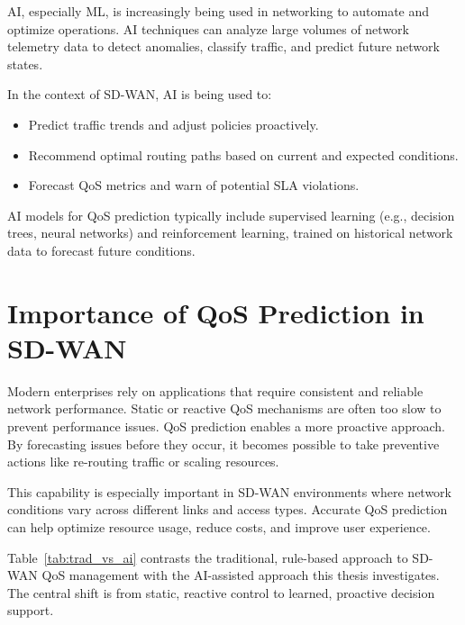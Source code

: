 \documentclass[a4paper,12pt]{Classes/RoboticsLaTeX}
\begin{document}
    AI, especially ML, is increasingly being used in networking to automate and optimize operations. AI techniques can analyze large volumes of network telemetry data to detect anomalies, classify traffic, and predict future network states.
    
    In the context of SD-WAN, AI is being used to:
    \begin{itemize}
        \item Predict traffic trends and adjust policies proactively.
        \item Recommend optimal routing paths based on current and expected conditions.
        \item Forecast QoS metrics and warn of potential SLA violations.
    \end{itemize}
    
    AI models for QoS prediction typically include supervised learning (e.g., decision trees, neural networks) and reinforcement learning, trained on historical network data to forecast future conditions.
    
    \section{Importance of QoS Prediction in SD-WAN}
    
    Modern enterprises rely on applications that require consistent and reliable network performance. Static or reactive QoS mechanisms are often too slow to prevent performance issues. QoS prediction enables a more proactive approach. By forecasting issues before they occur, it becomes possible to take preventive actions like re-routing traffic or scaling resources.
    
    This capability is especially important in SD-WAN environments where network conditions vary across different links and access types. Accurate QoS prediction can help optimize resource usage, reduce costs, and improve user experience.

    Table~\ref{tab:trad_vs_ai} contrasts the traditional, rule-based approach to SD-WAN QoS management with the AI-assisted approach this thesis investigates. The central shift is from static, reactive control to learned, proactive decision support.
\end{document}
